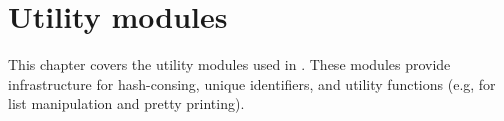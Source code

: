 \chapter{Utility modules}

This chapter covers the utility modules used in \ZooCrypt.
These modules provide infrastructure for hash-consing,
unique identifiers, and utility functions (e.g, for list
manipulation and pretty printing).